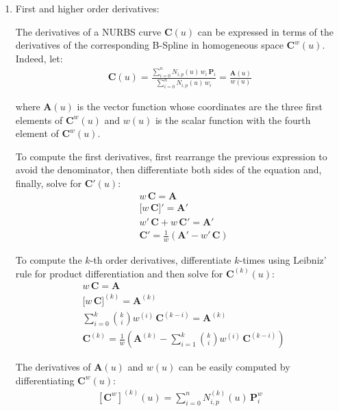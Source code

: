 \begin{enumerate}
    This property is important to evaluate the derivatives of NURBS curves.
    
    \item First and higher order derivatives:
    
    The derivatives of a NURBS curve $\mathbf{C}(u)$ can be expressed in terms of the derivatives of the corresponding B-Spline in homogeneous space $\mathbf{C}^{w}(u)$. Indeed, let:
    \begin{align*}
        \mathbf{C}(u) = \frac{\sum\limits_{i=0}^{n} N_{i,p}(u)\, w_{i} \,\mathbf{P}_{i}}{\sum\limits_{i=0}^{n} N_{i,p}(u)\, w_{i}} = \frac{\mathbf{A}(u)}{w(u)}
    \end{align*}
    
    where $\mathbf{A}(u)$ is the vector function whose coordinates are the three first elements of $\mathbf{C}^{w}(u)$ and $w(u)$ is the scalar function with the fourth element of $\mathbf{C}^{w}(u)$.
    
    To compute the first derivatives, first rearrange the previous expression to avoid the denominator, then differentiate both sides of the equation and, finally, solve for $\mathbf{C}'(u)$:
    \begin{align*}
        & w \, \mathbf{C} = \mathbf{A} \\
        & \big[ w \, \mathbf{C} \big] ' = \mathbf{A}' \\
        & w' \, \mathbf{C} + w \, \mathbf{C}' = \mathbf{A}' \\
        & \mathbf{C}' = \frac{1}{w} \left(\mathbf{A}' - w' \, \mathbf{C} \right)
    \end{align*}
    
    To compute the $k$-th order derivatives, differentiate $k$-times using Leibniz' rule for product differentiation and then solve for $\mathbf{C}^{(k)}(u)$:
    \begin{align*}
        & w \, \mathbf{C} = \mathbf{A} \\
        & \big[ w \, \mathbf{C} \big]^{(k)} = \mathbf{A}^{(k)} \\
        & \sum_{i=0}^{k} \binom{k}{i} w^{(i)} \, \mathbf{C}^{(k-i)} = \mathbf{A}^{(k)} \\
        & \mathbf{C}^{(k)} =  \frac{1}{w} \left(\mathbf{A}^{(k)} - \sum\limits_{i=1}^{k} \binom{k}{i} w^{(i)} \, \mathbf{C}^{(k-i)} \right)
    \end{align*}
    
    The derivatives of $\mathbf{A}(u)$ and $w(u)$ can be easily computed by differentiating $\mathbf{C}^{w}(u)$:
        \begin{align*}
             \left[\mathbf{C}^{w}\right]^{(k)}(u)  = \sum_{i=0}^{n}N^{(k)}_{i,p}(u)\, \mathbf{P}^{w}_{i}
        \end{align*}
    


\end{enumerate}
